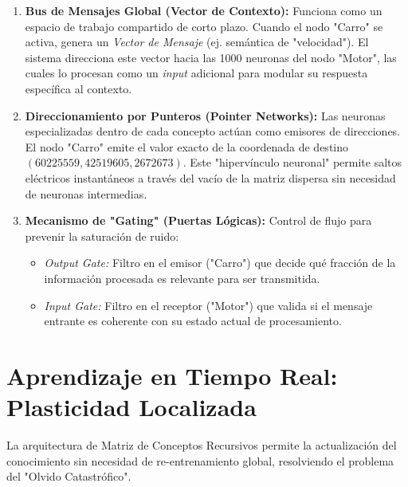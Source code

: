 \documentclass[12pt]{article}
\begin{document}
\begin{enumerate}
    \item \textbf{Bus de Mensajes Global (Vector de Contexto):} 
    Funciona como un espacio de trabajo compartido de corto plazo. Cuando el nodo "Carro" se activa, genera un \textit{Vector de Mensaje} (ej. semántica de "velocidad"). El sistema direcciona este vector hacia las 1000 neuronas del nodo "Motor", las cuales lo procesan como un \textit{input} adicional para modular su respuesta específica al contexto.
    
    \item \textbf{Direccionamiento por Punteros (Pointer Networks):} 
    Las neuronas especializadas dentro de cada concepto actúan como emisores de direcciones. El nodo "Carro" emite el valor exacto de la coordenada de destino $(60225559, 42519605, 2672673)$. Este "hipervínculo neuronal" permite saltos eléctricos instantáneos a través del vacío de la matriz dispersa sin necesidad de neuronas intermedias.
    
    \item \textbf{Mecanismo de "Gating" (Puertas Lógicas):} 
    Control de flujo para prevenir la saturación de ruido:
    \begin{itemize}
        \item \textit{Output Gate:} Filtro en el emisor ("Carro") que decide qué fracción de la información procesada es relevante para ser transmitida.
        \item \textit{Input Gate:} Filtro en el receptor ("Motor") que valida si el mensaje entrante es coherente con su estado actual de procesamiento.
    \end{itemize}
\end{enumerate}



\section{Aprendizaje en Tiempo Real: Plasticidad Localizada}
La arquitectura de Matriz de Conceptos Recursivos permite la actualización del conocimiento sin necesidad de re-entrenamiento global, resolviendo el problema del "Olvido Catastrófico".
\end{document}
